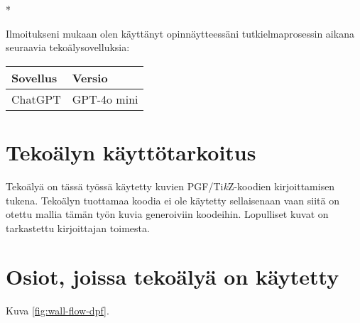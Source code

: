 \begin{aidisclaimer} * %

Ilmoitukseni mukaan olen käyttänyt opinnäytteessäni tutkielmaprosessin aikana
seuraavia tekoälysovelluksia:

\begin{center}
    \begin{tabularx}{\linewidth}{X|l}
        \toprule
        \textbf{Sovellus} & \textbf{Versio} \\
        \midrule
        ChatGPT & GPT-4o mini \\
        \bottomrule
    \end{tabularx}
\end{center}

\section*{Tekoälyn käyttötarkoitus}

Tekoälyä on tässä työssä käytetty kuvien PGF/Ti\emph{k}Z-koodien kirjoittamisen tukena. Tekoälyn tuottamaa koodia ei ole käytetty sellaisenaan vaan siitä on otettu mallia tämän työn kuvia generoiviin koodeihin.
Lopulliset kuvat on tarkastettu kirjoittajan toimesta.

\section*{Osiot, joissa tekoälyä on käytetty}

Kuva \ref{fig:wall-flow-dpf}.

\end{aidisclaimer}
